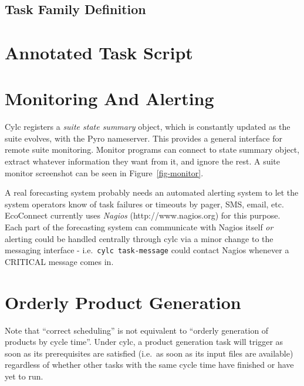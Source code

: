\documentclass[11pt,a4paper]{article}
\begin{document}
\subsection{Task Family Definition}
\label{AnnotatedTaskFamilyDefinitionReferenceFile}
\lstset{language=cylctaskdef}

\lstset{language=}


\pagebreak
\section{Annotated Task Script}
\label{AnnotatedTaskScript}



\lstset{language=bash}



\pagebreak
\appendix

\section{Monitoring And Alerting}
\label{SuiteMonitor}

Cylc registers a {\em suite state summary} object, which is constantly
updated as the suite evolves, with the Pyro nameserver. This provides a
general interface for remote suite monitoring. Monitor programs can
connect to state summary object, extract whatever information they want
from it, and ignore the rest. A suite monitor screenshot can be seen in
Figure~\ref{fig-monitor}.

A real forecasting system probably needs an automated alerting system
to let the system operators know of task failures or timeouts by pager,
SMS, email, etc.  EcoConnect currently uses {\em Nagios}
(http://www.nagios.org) for this purpose. Each part of the forecasting
system can communicate with Nagios itself {\em or} alerting could be
handled centrally through cylc via a minor change to the messaging
interface - i.e.\ \lstinline=cylc task-message= could contact Nagios
whenever a CRITICAL message comes in.

\section{Orderly Product Generation}
\label{OrderlyProductGeneration}

Note that ``correct scheduling'' is not equivalent to ``orderly
generation of products by cycle time''.  Under cylc, a product
generation task will trigger as soon as its prerequisites are satisfied 
(i.e.\ as soon as its input files are available) regardless of
whether other tasks with the same cycle time have finished or have yet
to run. 
\end{document}
